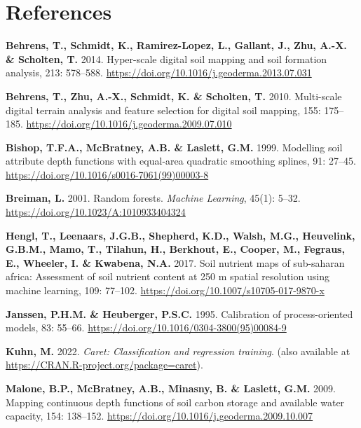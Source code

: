 \documentclass[
  10pt,
  b5paper,
  oneside]{book}
\newlength{\cslhangindent}
\newlength{\cslentryspacingunit} %
\newenvironment{CSLReferences}[2] %
 {%
  \setlength{\parindent}{0pt}
  \ifodd #1
  \let\oldpar\par
  \def\par{\hangindent=\cslhangindent\oldpar}
  \fi
  \setlength{\parskip}{#2\cslentryspacingunit}
 }%
 {}
\begin{document}
\hypertarget{references}{%
\chapter*{References}\label{references}}

\hypertarget{refs}{}
\begin{CSLReferences}{0}{0}
\leavevmode{}%
\textbf{Behrens, T., Schmidt, K., Ramirez-Lopez, L., Gallant, J., Zhu, A.-X. \& Scholten, T.} 2014. Hyper-scale digital soil mapping and soil formation analysis, 213: 578--588. \url{https://doi.org/10.1016/j.geoderma.2013.07.031}

\leavevmode{}%
\textbf{Behrens, T., Zhu, A.-X., Schmidt, K. \& Scholten, T.} 2010. Multi-scale digital terrain analysis and feature selection for digital soil mapping, 155: 175--185. \url{https://doi.org/10.1016/j.geoderma.2009.07.010}

\leavevmode{}%
\textbf{Bishop, T.F.A., McBratney, A.B. \& Laslett, G.M.} 1999. Modelling soil attribute depth functions with equal-area quadratic smoothing splines, 91: 27--45. \url{https://doi.org/10.1016/s0016-7061(99)00003-8}

\leavevmode{}%
\textbf{Breiman, L.} 2001. Random forests. \emph{Machine Learning}, 45(1): 5--32. \url{https://doi.org/10.1023/A:1010933404324}

\leavevmode{}%
\textbf{Hengl, T., Leenaars, J.G.B., Shepherd, K.D., Walsh, M.G., Heuvelink, G.B.M., Mamo, T., Tilahun, H., Berkhout, E., Cooper, M., Fegraus, E., Wheeler, I. \& Kwabena, N.A.} 2017. Soil nutrient maps of sub-saharan africa: Assessment of soil nutrient content at 250 m spatial resolution using machine learning, 109: 77--102. \url{https://doi.org/10.1007/s10705-017-9870-x}

\leavevmode{}%
\textbf{Janssen, P.H.M. \& Heuberger, P.S.C.} 1995. Calibration of process-oriented models, 83: 55--66. \url{https://doi.org/10.1016/0304-3800(95)00084-9}

\leavevmode{}%
\textbf{Kuhn, M.} 2022. \emph{Caret: Classification and regression training}. (also available at \url{https://CRAN.R-project.org/package=caret}).

\leavevmode{}%
\textbf{Malone, B.P., McBratney, A.B., Minasny, B. \& Laslett, G.M.} 2009. Mapping continuous depth functions of soil carbon storage and available water capacity, 154: 138--152. \url{https://doi.org/10.1016/j.geoderma.2009.10.007}


\end{CSLReferences}
\end{document}
